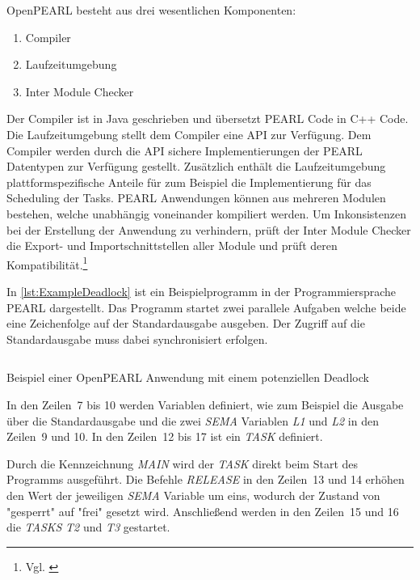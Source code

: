 OpenPEARL besteht aus drei wesentlichen
Komponenten\autocite{OpenPEARL_Structure}:
\begin{enumerate}
  \item Compiler
  \item Laufzeitumgebung
  \item Inter Module Checker
\end{enumerate}
Der Compiler ist in Java geschrieben und übersetzt PEARL Code in C++ Code. Die
Laufzeitumgebung stellt dem Compiler eine API zur Verfügung. Dem Compiler werden
durch die API sichere Implementierungen der PEARL Datentypen zur Verfügung
gestellt. Zusätzlich enthält die Laufzeitumgebung plattformspezifische Anteile
für zum Beispiel die Implementierung für das Scheduling der Tasks. PEARL
Anwendungen können aus mehreren Modulen bestehen, welche unabhängig voneinander
kompiliert werden. Um Inkonsistenzen bei der Erstellung der Anwendung zu
verhindern, prüft der Inter Module Checker die Export- und Importschnittstellen
aller Module und prüft deren Kompatibilität.\footnote{Vgl.
\autocite{OpenPEARL_Structure}}

In \cref{lst:ExampleDeadlock} ist ein Beispielprogramm in der Programmiersprache
PEARL dargestellt. Das Programm startet zwei parallele Aufgaben welche beide
eine Zeichenfolge auf der Standardausgabe ausgeben. Der Zugriff auf die
Standardausgabe muss dabei synchronisiert erfolgen.
\begin{listing}[ht]
  \inputminted[frame=lines,linenos]{vim}{./Examples/Example_Deadlock.prl}
  \caption{Beispiel einer OpenPEARL Anwendung mit einem potenziellen Deadlock}
  \label{lst:ExampleDeadlock}   
\end{listing} 
In den Zeilen~7 bis 10 werden Variablen definiert, wie zum Beispiel die Ausgabe
über die Standardausgabe und die zwei \emph{SEMA} Variablen \emph{L1} und
\emph{L2} in den Zeilen~9 und 10. In den Zeilen~12 bis 17 ist ein \emph{TASK}
definiert.

Durch die Kennzeichnung \emph{MAIN} wird der \emph{TASK} direkt beim Start des
Programms ausgeführt. Die Befehle \emph{RELEASE} in den Zeilen~13 und 14 erhöhen
den Wert der jeweiligen \emph{SEMA} Variable um eins, wodurch der Zustand von
"gesperrt" auf "frei" gesetzt wird. Anschließend werden in den Zeilen~15 und 16
die \emph{TASKS} \emph{T2} und \emph{T3} gestartet.

